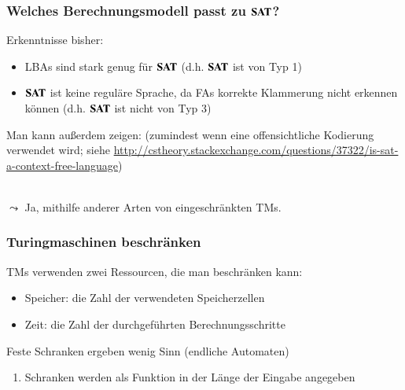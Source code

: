 \documentclass[aspectratio=1610,onlymath]{beamer}
\begin{document}
\begin{frame}\frametitle{Welches Berechnungsmodell passt zu $\textbf{\textcolor{black}{SAT}}$?}

Erkenntnisse bisher:
\begin{itemize}
\item LBAs sind stark genug für $\textbf{\textcolor{black}{SAT}}$ (d.h. $\textbf{\textcolor{black}{SAT}}$ ist von Typ 1)
\item $\textbf{\textcolor{black}{SAT}}$ ist keine reguläre Sprache, da FAs korrekte Klammerung nicht erkennen können (d.h. $\textbf{\textcolor{black}{SAT}}$ ist nicht von Typ 3)
\end{itemize}\bigskip\pause

Man kann außerdem zeigen:
(zumindest wenn eine offensichtliche Kodierung verwendet wird; siehe
\url{http://cstheory.stackexchange.com/questions/37322/is-sat-a-context-free-language})
\bigskip\pause

\\\pause
$\leadsto$ Ja, mithilfe anderer Arten von eingeschränkten TMs.

\end{frame}


\begin{frame}\frametitle{Turingmaschinen beschränken}

TMs verwenden zwei Ressourcen, die man beschränken kann:
\begin{itemize}
\item \alert{Speicher:} die Zahl der verwendeten Speicherzellen
\item \alert{Zeit:} die Zahl der durchgeführten Berechnungsschritte
\end{itemize}\pause
Feste Schranken ergeben wenig Sinn (endliche Automaten)\\
\begin{enumerate}[$\leadsto$]
\item Schranken werden als Funktion in der Länge der Eingabe angegeben
\end{enumerate}
\bigskip


\end{frame}
\end{document}
